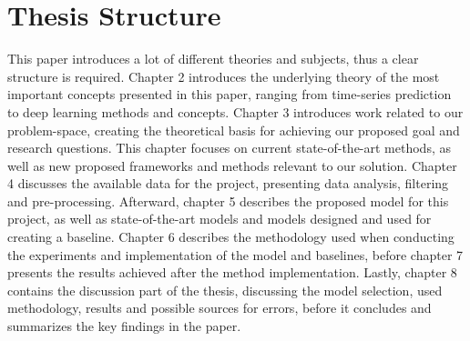
\section{Thesis Structure}
\label{sections:Introduction:Structure}

This paper introduces a lot of different theories and subjects,
thus a clear structure is required.
Chapter 2 introduces the underlying theory of the most important concepts presented in this paper,
ranging from time-series prediction to deep learning methods and concepts.
Chapter 3 introduces work related to our problem-space, creating the theoretical basis for achieving our proposed goal and research questions.
This chapter focuses on current state-of-the-art methods,
as well as new proposed frameworks and methods relevant to our solution.
Chapter 4 discusses the available data for the project, presenting data analysis, filtering and pre-processing.
Afterward, chapter 5 describes the proposed model for this project, as well as state-of-the-art models and models designed and used for creating a baseline.
Chapter 6 describes the methodology used when conducting the experiments and implementation of the model and baselines,
before chapter 7 presents the results achieved after the method implementation.
Lastly, chapter 8 contains the discussion part of the thesis, discussing the model selection, used methodology, results and possible sources for errors,
before it concludes and summarizes the key findings in the paper.



\iffalse
This paper introduces a lot of different theories and subjects,
thus a clear structure is required.
Chapter 2 introduces the underlying theory of the most important concepts presented in this paper,
ranging from time-series prediction to deep learning methods and concepts.
Chapter 3 introduces work related to our problem-space, creating the theoretical basis for achieving our proposed goal and research questions.
This chapter focuses on current state-of-the-art methods,
as well as new proposed frameworks and methods relevant to our solution.
Chapter 4 introduces our proposed method and architecture,
presenting the model framework and model structure.
Lastly, chapter 5 supplies an evaluation and discussion of the proposed framework regarding our proposed research questions and goal.
\fi


